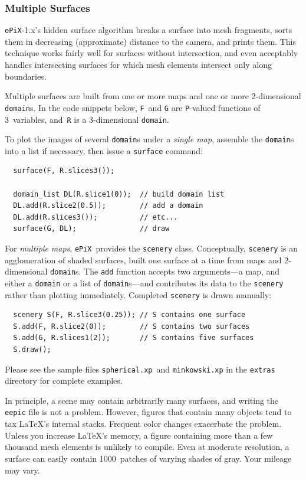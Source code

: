 \documentclass[12pt]{report}
\newcommand{\code}[1]{\texttt{#1}}
\newcommand{\filename}[1]{\texttt{#1}}
\newcommand{\ePiX}{\code{ePiX}}
\begin{document}
\subsubsection*{Multiple Surfaces}

\ePiX-1.x's hidden surface algorithm breaks a surface into mesh
fragments, sorts them in decreasing (approximate) distance to the
camera, and prints them. This technique works fairly well for surfaces
without intersection, and even acceptably handles intersecting
surfaces for which mesh elements intersect only along boundaries.

Multiple surfaces are built from one or more maps and one or more
2-dimensional \code{domain}s. In the code snippets below, \code{F}~and
\code{G} are \code{P}-valued functions of 3~variables, and~\code{R} is
a 3-dimensional \code{domain}.

To plot the images of several \code{domain}s under a \emph{single
map}, assemble the \code{domain}s into a list if necessary, then issue
a \code{surface} command:
\begin{verbatim}
  surface(F, R.slices3());

  domain_list DL(R.slice1(0));  // build domain list
  DL.add(R.slice2(0.5));        // add a domain
  DL.add(R.slices3());          // etc...
  surface(G, DL);               // draw
\end{verbatim}

For \emph{multiple maps}, \ePiX\ provides the \code{scenery}
class. Conceptually, \code{scenery} is an agglomeration of shaded
surfaces, built one surface at a time from maps and 2-dimensional
\code{domain}s. The \code{add} function accepts two arguments---a map,
and either a \code{domain} or a list of \code{domain}s---and
contributes its data to the \code{scenery} rather than plotting
immediately. Completed \code{scenery} is drawn manually:
\begin{verbatim}
  scenery S(F, R.slice3(0.25)); // S contains one surface
  S.add(F, R.slice2(0));        // S contains two surfaces
  S.add(G, R.slices1(2));       // S contains five surfaces
  S.draw();
\end{verbatim}

Please see the sample files \filename{spherical.xp}~and
\filename{minkowski.xp} in the \filename{extras} directory for
complete examples.

In principle, a scene may contain arbitrarily many surfaces, and
writing the \code{eepic} file is not a problem. However, figures that
contain many objects tend to tax \LaTeX's internal stacks. Frequent
color changes exacerbate the problem.  Unless you increase \LaTeX's
memory, a figure containing more than a few thousand mesh elements is
unlikely to compile. Even at moderate resolution, a surface can easily
contain 1000~patches of varying shades of gray. Your mileage may vary.
\end{document}
